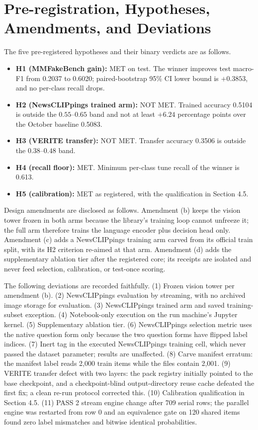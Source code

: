 \documentclass{article} %
\begin{document}



\appendix
\section{Pre-registration, Hypotheses, Amendments, and Deviations}
\label{app:protocol}
The five pre-registered hypotheses and their binary verdicts are as follows.
\begin{itemize}
    \item \textbf{H1 (MMFakeBench gain):} MET on test. The winner improves test macro-F1 from 0.2037 to 0.6020; paired-bootstrap 95\% CI lower bound is \(+0.3853\), and no per-class recall drops.
    \item \textbf{H2 (NewsCLIPpings trained arm):} NOT MET. Trained accuracy 0.5104 is outside the \(0.55\)--\(0.65\) band and not at least \(+6.24\) percentage points over the October baseline 0.5083.
    \item \textbf{H3 (VERITE transfer):} NOT MET. Transfer accuracy 0.3506 is outside the \(0.38\)--\(0.48\) band.
    \item \textbf{H4 (recall floor):} MET. Minimum per-class tune recall of the winner is 0.613.
    \item \textbf{H5 (calibration):} MET as registered, with the qualification in Section 4.5.
\end{itemize}

Design amendments are disclosed as follows. Amendment (b) keeps the vision tower frozen in both arms because the library's training loop cannot unfreeze it; the full arm therefore trains the language encoder plus decision head only. Amendment (c) adds a NewsCLIPpings training arm carved from its official train split, with its H2 criterion re-aimed at that arm. Amendment (d) adds the supplementary ablation tier after the registered core; its receipts are isolated and never feed selection, calibration, or test-once scoring.

The following deviations are recorded faithfully. (1) Frozen vision tower per amendment (b). (2) NewsCLIPpings evaluation by streaming, with no archived image storage for evaluation. (3) NewsCLIPpings trained arm and saved training-subset exception. (4) Notebook-only execution on the run machine's Jupyter kernel. (5) Supplementary ablation tier. (6) NewsCLIPpings selection metric uses the native question form only because the two question forms have flipped label indices. (7) Inert tag in the executed NewsCLIPpings training cell, which never passed the dataset parameter; results are unaffected. (8) Carve manifest erratum: the manifest label reads 2,000 train items while the files contain 2,001. (9) VERITE transfer defect with two layers: the pack registry initially pointed to the base checkpoint, and a checkpoint-blind output-directory reuse cache defeated the first fix; a clean re-run protocol corrected this. (10) Calibration qualification in Section 4.5. (11) PASS 2 stream engine change after 709 serial rows; the parallel engine was restarted from row 0 and an equivalence gate on 120 shared items found zero label mismatches and bitwise identical probabilities.
\end{document}

